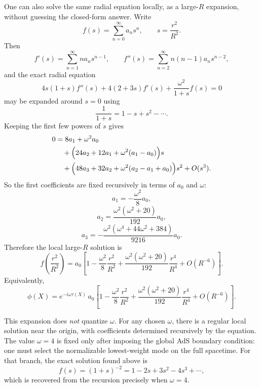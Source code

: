 \documentclass[12pt]{article}
\begin{document}
One can also solve the same radial equation locally, as a large-$R$ expansion, without guessing the
closed-form answer.  Write
\begin{equation}
f(s)=\sum_{n=0}^\infty a_n s^n,
\qquad
s=\frac{r^2}{R^2}.
\end{equation}
Then
\begin{equation}
f'(s)=\sum_{n=1}^\infty n a_n s^{n-1},
\qquad
f''(s)=\sum_{n=2}^\infty n(n-1)a_n s^{n-2},
\end{equation}
and the exact radial equation
\begin{equation}
4s(1+s)f''(s)+4(2+3s)f'(s)+\frac{\omega^2}{1+s}f(s)=0
\end{equation}
may be expanded around $s=0$ using
\begin{equation}
\frac{1}{1+s}=1-s+s^2-\cdots.
\end{equation}
Keeping the first few powers of $s$ gives
\begin{align}
0
&=
8a_1+\omega^2 a_0 \notag\\
&\quad
+\Big(24a_2+12a_1+\omega^2(a_1-a_0)\Big)s \notag\\
&\quad
+\Big(48a_3+32a_2+\omega^2(a_2-a_1+a_0)\Big)s^2
+O(s^3).
\end{align}
So the first coefficients are fixed recursively in terms of $a_0$ and $\omega$:
\begin{equation}
a_1=-\frac{\omega^2}{8}a_0,
\end{equation}
\begin{equation}
a_2=\frac{\omega^2(\omega^2+20)}{192}a_0,
\end{equation}
\begin{equation}
a_3=-\frac{\omega^2(\omega^4+44\omega^2+384)}{9216}a_0.
\end{equation}
Therefore the local large-$R$ solution is
\begin{equation}
f\!\left(\frac{r^2}{R^2}\right)
=
a_0\left[
1
-\frac{\omega^2}{8}\frac{r^2}{R^2}
+\frac{\omega^2(\omega^2+20)}{192}\frac{r^4}{R^4}
+O(R^{-6})
\right].
\end{equation}
Equivalently,
\begin{equation}
\phi(X)
=
e^{-i\omega\tau(X)}\,a_0\left[
1
-\frac{\omega^2}{8}\frac{r^2}{R^2}
+\frac{\omega^2(\omega^2+20)}{192}\frac{r^4}{R^4}
+O(R^{-6})
\right].
\end{equation}

This expansion does \emph{not} quantize $\omega$.  For any chosen $\omega$, there is a regular local
solution near the origin, with coefficients determined recursively by the equation.  The value
$\omega=4$ is fixed only after imposing the global AdS boundary condition: one must select the
normalizable lowest-weight mode on the full spacetime.  For that branch, the exact solution found above
is
\begin{equation}
f(s)=(1+s)^{-2}=1-2s+3s^2-4s^3+\cdots,
\end{equation}
which is recovered from the recursion precisely when $\omega=4$.
\end{document}
